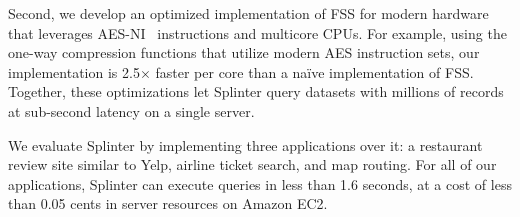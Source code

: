 Second, we develop an optimized implementation of FSS for modern hardware that leverages AES-NI~\cite{aes-ni} instructions and multicore CPUs.
For example, using the one-way compression functions that utilize modern AES instruction sets, our implementation is 2.5$\times$ faster per core than a na\"ive implementation of FSS.
Together, these optimizations let Splinter query datasets with millions of records at sub-second latency on a single server.

We evaluate Splinter by implementing 
three applications over it: a restaurant review site similar to Yelp, 
airline ticket search, and map routing.
For all of our applications, Splinter can execute queries in less than 1.6 seconds, at a cost of less than 0.05 cents in server resources on Amazon EC2.




